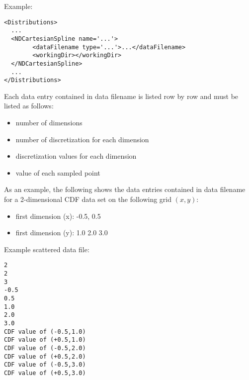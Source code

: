 Example:
\begin{lstlisting}[style=XML]
<Distributions>
  ...
  <NDCartesianSpline name='...'>
        <dataFilename type='...'>...</dataFilename>
        <workingDir></workingDir>
  </NDCartesianSpline>
  ...
</Distributions>
\end{lstlisting}

Each data entry contained in data \textunderscore filename is listed row by row and must be listed as follows:
\begin{itemize}
\item number of dimensions
\item number of discretization for each dimension
\item discretization values for each dimension
\item value of each sampled point
\end{itemize}

As an example, the following shows the data entries contained in data \textunderscore filename for a 2-dimensional CDF data set on the following grid $(x,y)$:
\begin{itemize}
\item first dimension (x): -0.5, 0.5
\item first dimension (y): 1.0 2.0 3.0
\end{itemize}

Example scattered data file:
\begin{lstlisting}
2
2
3
-0.5
0.5
1.0
2.0
3.0
CDF value of (-0.5,1.0)
CDF value of (+0.5,1.0)
CDF value of (-0.5,2.0)
CDF value of (+0.5,2.0)
CDF value of (-0.5,3.0)
CDF value of (+0.5,3.0)
\end{lstlisting}
